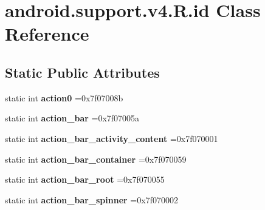 \hypertarget{classandroid_1_1support_1_1v4_1_1R_1_1id}{}\section{android.\+support.\+v4.\+R.\+id Class Reference}
\label{classandroid_1_1support_1_1v4_1_1R_1_1id}
\subsection*{Static Public Attributes}
\begin{DoxyCompactItemize}
\item 
\mbox{\label{classandroid_1_1support_1_1v4_1_1R_1_1id_a5a23205f1f2fe4f5b78a0eafe56b5004}} 
static int {\bfseries action0} =0x7f07008b
\item 
\mbox{\label{classandroid_1_1support_1_1v4_1_1R_1_1id_a0ecddb6a2a10d8e36750dbdfc59e6049}} 
static int {\bfseries action\+\_\+bar} =0x7f07005a
\item 
\mbox{\label{classandroid_1_1support_1_1v4_1_1R_1_1id_a66348167573ed1171b740e7b74e06e12}} 
static int {\bfseries action\+\_\+bar\+\_\+activity\+\_\+content} =0x7f070001
\item 
\mbox{\label{classandroid_1_1support_1_1v4_1_1R_1_1id_aa63a6091ff39f1a151185edb70ec1edb}} 
static int {\bfseries action\+\_\+bar\+\_\+container} =0x7f070059
\item 
\mbox{\label{classandroid_1_1support_1_1v4_1_1R_1_1id_ac5a38a0a9ccaf5fc5e9e5a7940f8e0a3}} 
static int {\bfseries action\+\_\+bar\+\_\+root} =0x7f070055
\item 
\mbox{\label{classandroid_1_1support_1_1v4_1_1R_1_1id_ac1d3acb5b41511188b55c6e90c2f95ba}} 
static int {\bfseries action\+\_\+bar\+\_\+spinner} =0x7f070002
\item 
\mbox{\label{classandroid_1_1support_1_1v4_1_1R_1_1id_a50604032858b3beae98841e2d6be2c7d}} 

\end{DoxyCompactItemize}
